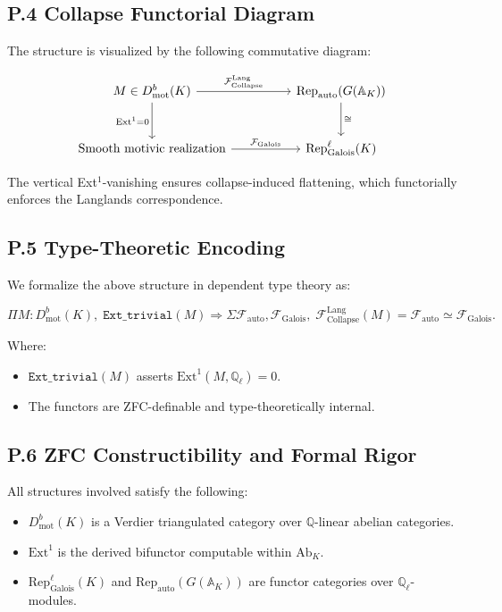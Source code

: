 \documentclass[11pt]{article}
\begin{document}
\subsection*{P.4 Collapse Functorial Diagram}

The structure is visualized by the following commutative diagram:

\[
\begin{tikzcd}[column sep=huge, row sep=large]
M \in D^b_{\mathrm{mot}}(K) \arrow[r, "\mathcal{F}_{\mathrm{Collapse}}^{\mathrm{Lang}}"] \arrow[d, swap, "\mathrm{Ext}^1 = 0"]
& \mathrm{Rep}_{\mathrm{auto}}(G(\mathbb{A}_K)) \arrow[d, "\cong"] \\
\text{Smooth motivic realization} \arrow[r, "\mathcal{F}_{\mathrm{Galois}}"]
& \mathrm{Rep}^\ell_{\mathrm{Galois}}(K)
\end{tikzcd}
\]

The vertical Ext$^1$-vanishing ensures collapse-induced flattening, which functorially enforces the Langlands correspondence.

\subsection*{P.5 Type-Theoretic Encoding}

We formalize the above structure in dependent type theory as:

\[
\Pi M : D^b_{\mathrm{mot}}(K),\;
\texttt{Ext\_trivial}(M) \Rightarrow
\Sigma \mathcal{F}_{\mathrm{auto}}, \mathcal{F}_{\mathrm{Galois}},\;
\mathcal{F}_{\mathrm{Collapse}}^{\mathrm{Lang}}(M) = \mathcal{F}_{\mathrm{auto}} \simeq \mathcal{F}_{\mathrm{Galois}}.
\]

Where:
\begin{itemize}
  \item $\texttt{Ext\_trivial}(M)$ asserts $\mathrm{Ext}^1(M, \mathbb{Q}_\ell) = 0$.
  \item The functors are ZFC-definable and type-theoretically internal.
\end{itemize}

\subsection*{P.6 ZFC Constructibility and Formal Rigor}

All structures involved satisfy the following:

\begin{itemize}
  \item $D^b_{\mathrm{mot}}(K)$ is a Verdier triangulated category over $\mathbb{Q}$-linear abelian categories.
  \item $\mathrm{Ext}^1$ is the derived bifunctor computable within $\mathrm{Ab}_K$.
  \item $\mathrm{Rep}^\ell_{\mathrm{Galois}}(K)$ and $\mathrm{Rep}_{\mathrm{auto}}(G(\mathbb{A}_K))$ are functor categories over $\mathbb{Q}_\ell$-modules.
\end{itemize}
\end{document}
